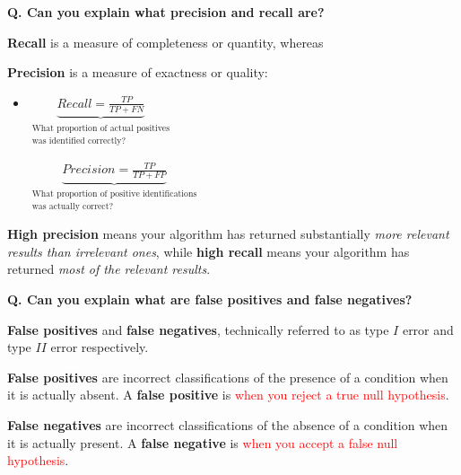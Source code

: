 \begin{frame}[fragile]{\textbf{Q. Can you explain what precision and recall are?}}
\begin{wideitemize}
  \item \textbf{Recall} is a measure of completeness or quantity, whereas
   \item \textbf{Precision} is a measure of exactness or quality:\vspace{.4em}
  \begin{itemize}
    \item \parbox[t]{1.5in}{$\underbrace{Recall = \frac{TP}{TP +
            FN}}_{\substack{\text{What proportion of actual positives}\\ \text{was identified correctly?}}}$} \hspace{.6in}
      \parbox[t]{1.5in}{$\underbrace{Precision = \frac{TP}{TP + FP}}_{\substack{\text{What
            proportion of positive identifications}\\\text{was actually correct?}}}$}
  \end{itemize}
  \item \textbf{High precision} means your algorithm has returned
  substantially \textit{more relevant results than irrelevant ones}, while
  \textbf{high recall} means your algorithm has returned \textit{most of the
  relevant results}.
\end{wideitemize}
\end{frame}


\begin{frame}[fragile]{\textbf{Q. Can you explain what are false positives and false negatives?}}
  \begin{wideitemize}
  \item \textbf{False positives} and \textbf{false negatives}, technically
    referred to as type $I$ error and type $II$ error respectively.
  \item \textbf{False positives} are incorrect classifications of the presence
    of a condition when it is actually absent. {\footnotesize A \textbf{false positive} is \textcolor{red}{when you
      reject a true null hypothesis}}.
  \item \textbf{False negatives} are incorrect classifications of the absence of
    a condition when it is actually present. {\footnotesize A \textbf{false negative} is \textcolor{red}{when you accept
      a false null hypothesis}}.
  \end{wideitemize}
\end{frame}

